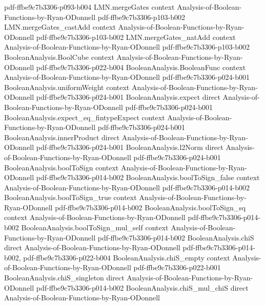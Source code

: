 \begin{theorem}
  {pdf-ffbe9c7b3306-p093-b004}
\proofstep
  {LMN.mergeGates}
  {context}
  {Analysis-of-Boolean-Functions-by-Ryan-ODonnell}
  {pdf-ffbe9c7b3306-p103-b002}
\proofstep
  {LMN.mergeGates_castAdd}
  {context}
  {Analysis-of-Boolean-Functions-by-Ryan-ODonnell}
  {pdf-ffbe9c7b3306-p103-b002}
\proofstep
  {LMN.mergeGates_natAdd}
  {context}
  {Analysis-of-Boolean-Functions-by-Ryan-ODonnell}
  {pdf-ffbe9c7b3306-p103-b002}
\proofstep
  {BooleanAnalysis.BoolCube}
  {context}
  {Analysis-of-Boolean-Functions-by-Ryan-ODonnell}
  {pdf-ffbe9c7b3306-p022-b004}
\proofstep
  {BooleanAnalysis.BooleanFunc}
  {context}
  {Analysis-of-Boolean-Functions-by-Ryan-ODonnell}
  {pdf-ffbe9c7b3306-p024-b001}
\proofstep
  {BooleanAnalysis.uniformWeight}
  {context}
  {Analysis-of-Boolean-Functions-by-Ryan-ODonnell}
  {pdf-ffbe9c7b3306-p024-b001}
\proofstep
  {BooleanAnalysis.expect}
  {direct}
  {Analysis-of-Boolean-Functions-by-Ryan-ODonnell}
  {pdf-ffbe9c7b3306-p024-b001}
\proofstep
  {BooleanAnalysis.expect_eq_fintypeExpect}
  {context}
  {Analysis-of-Boolean-Functions-by-Ryan-ODonnell}
  {pdf-ffbe9c7b3306-p024-b001}
\proofstep
  {BooleanAnalysis.innerProduct}
  {direct}
  {Analysis-of-Boolean-Functions-by-Ryan-ODonnell}
  {pdf-ffbe9c7b3306-p024-b001}
\proofstep
  {BooleanAnalysis.l2Norm}
  {direct}
  {Analysis-of-Boolean-Functions-by-Ryan-ODonnell}
  {pdf-ffbe9c7b3306-p024-b001}
\proofstep
  {BooleanAnalysis.boolToSign}
  {context}
  {Analysis-of-Boolean-Functions-by-Ryan-ODonnell}
  {pdf-ffbe9c7b3306-p014-b002}
\proofstep
  {BooleanAnalysis.boolToSign_false}
  {context}
  {Analysis-of-Boolean-Functions-by-Ryan-ODonnell}
  {pdf-ffbe9c7b3306-p014-b002}
\proofstep
  {BooleanAnalysis.boolToSign_true}
  {context}
  {Analysis-of-Boolean-Functions-by-Ryan-ODonnell}
  {pdf-ffbe9c7b3306-p014-b002}
\proofstep
  {BooleanAnalysis.boolToSign_sq}
  {context}
  {Analysis-of-Boolean-Functions-by-Ryan-ODonnell}
  {pdf-ffbe9c7b3306-p014-b002}
\proofstep
  {BooleanAnalysis.boolToSign_mul_self}
  {context}
  {Analysis-of-Boolean-Functions-by-Ryan-ODonnell}
  {pdf-ffbe9c7b3306-p014-b002}
\proofstep
  {BooleanAnalysis.chiS}
  {direct}
  {Analysis-of-Boolean-Functions-by-Ryan-ODonnell}
  {pdf-ffbe9c7b3306-p014-b002,
    pdf-ffbe9c7b3306-p022-b004}
\proofstep
  {BooleanAnalysis.chiS_empty}
  {context}
  {Analysis-of-Boolean-Functions-by-Ryan-ODonnell}
  {pdf-ffbe9c7b3306-p022-b001}
\proofstep
  {BooleanAnalysis.chiS_singleton}
  {direct}
  {Analysis-of-Boolean-Functions-by-Ryan-ODonnell}
  {pdf-ffbe9c7b3306-p014-b002}
\proofstep
  {BooleanAnalysis.chiS_mul_chiS}
  {direct}
  {Analysis-of-Boolean-Functions-by-Ryan-ODonnell}

\end{theorem}
